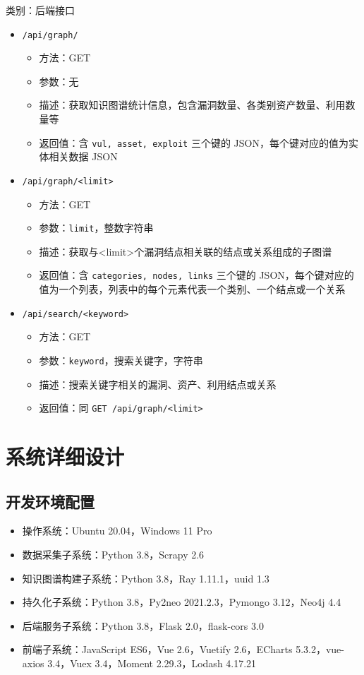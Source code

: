 \documentclass[a4paper,AutoFakeBold,oneside,12pt]{book}
\begin{document}
类别：后端接口
\begin{itemize}
	\item \lstinline|/api/graph/|
	      \begin{itemize}
		      \item 方法：GET
		      \item 参数：无
		      \item 描述：获取知识图谱统计信息，包含漏洞数量、各类别资产数量、利用数量等
		      \item 返回值：含 \lstinline|vul, asset, exploit| 三个键的 JSON，每个键对应的值为实体相关数据 JSON
	      \end{itemize}
	\item \lstinline|/api/graph/<limit>|
	      \begin{itemize}
		      \item 方法：GET
		      \item 参数：\lstinline|limit|，整数字符串
		      \item 描述：获取与<limit>个漏洞结点相关联的结点或关系组成的子图谱
		      \item 返回值：含 \lstinline|categories, nodes, links| 三个键的 JSON，每个键对应的值为一个列表，列表中的每个元素代表一个类别、一个结点或一个关系
	      \end{itemize}
	\item \lstinline|/api/search/<keyword>|
	      \begin{itemize}
		      \item 方法：GET
		      \item 参数：\lstinline|keyword|，搜索关键字，字符串
		      \item 描述：搜索关键字相关的漏洞、资产、利用结点或关系
		      \item 返回值：同 \lstinline|GET /api/graph/<limit>|
	      \end{itemize}
\end{itemize}

\section{系统详细设计}

\subsection{开发环境配置}

\begin{itemize}
	\item 操作系统：Ubuntu 20.04，Windows 11 Pro
	\item 数据采集子系统：Python 3.8，Scrapy 2.6
	\item 知识图谱构建子系统：Python 3.8，Ray 1.11.1，uuid 1.3
	\item 持久化子系统：Python 3.8，Py2neo 2021.2.3，Pymongo 3.12，Neo4j 4.4
	\item 后端服务子系统：Python 3.8，Flask 2.0，flask-cors 3.0
	\item 前端子系统：JavaScript ES6，Vue 2.6，Vuetify 2.6，ECharts 5.3.2，vue-axios 3.4，Vuex 3.4，Moment 2.29.3，Lodash 4.17.21
\end{itemize}
\end{document}
